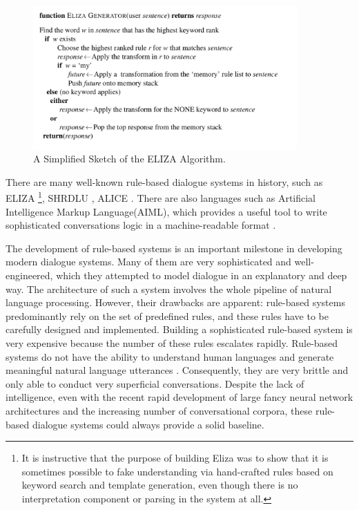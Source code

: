 \documentclass[bsc,frontabs,twoside,singlespacing,parskip,deptreport]{infthesis}     %
\begin{document}
\begin{figure}[h]
    \centering
    \includegraphics[width=0.9\textwidth]{elizarule.jpeg}
    \caption{A Simplified Sketch of the ELIZA Algorithm.}
    \label{fig:elizarule}
\end{figure}

There are many well-known rule-based dialogue systems in history, such as ELIZA \cite{weizenbaum1966eliza} \footnote{It is instructive that the purpose of building Eliza was to show that it is sometimes possible to fake understanding via hand-crafted rules based on keyword search and template generation, even though there is no interpretation component or parsing in the system at all.}, SHRDLU \cite{winograd1972shrdlu}, ALICE \cite{wallace1995artificial}. There are also languages such as Artificial Intelligence Markup Language(AIML), which provides a useful tool to write sophisticated conversations logic in a machine-readable format \cite{wallace1995artificial}.

The development of rule-based systems is an important milestone in developing modern dialogue systems. Many of them are very sophisticated and well-engineered, which they attempted to model dialogue in an explanatory and deep way. The architecture of such a system involves the whole pipeline of natural language processing. However, their drawbacks are apparent: rule-based systems predominantly rely on the set of predefined rules, and these rules have to be carefully designed and implemented. Building a sophisticated rule-based system is very expensive because the number of these rules escalates rapidly. Rule-based systems do not have the ability to understand human languages and generate meaningful natural language utterances \cite{jiweilithesis}. Consequently, they are very brittle and only able to conduct very superficial conversations. Despite the lack of intelligence, even with the recent rapid development of large fancy neural network architectures and the increasing number of conversational corpora, these rule-based dialogue systems could always provide a solid baseline.
\end{document}
